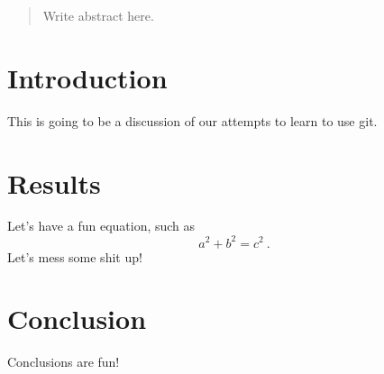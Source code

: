 \documentclass{article}
\begin{document}
\begin{abstract}
Write abstract here.
\end{abstract}

\section{Introduction}

This is going to be a discussion of our attempts to learn to use git.

\section{Results}

Let's have a fun equation, such as
\begin{equation}
a^2 + b^2 = c^2~.
\end{equation}
Let's mess some shit up!

\section{Conclusion}

Conclusions are fun!
\end{document}
